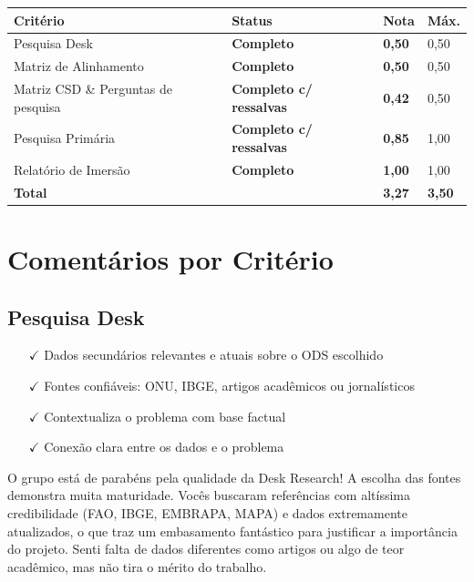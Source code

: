 \documentclass[
  sigconf,
  nonacm, %
  language=portuguese
]{acmart}
\newcommand{\statusok}[1]{{\small\bfseries\color{cgood}#1}}
\newcommand{\statuswarn}[1]{{\small\bfseries\color{cwarn}#1}}
\begin{document}
\begin{tabular}{@{} L{2.6cm} C{2.5cm} C{1.1cm} C{1.1cm} @{}}
\toprule
\textbf{Critério} & \textbf{Status} & \textbf{Nota} & \textbf{Máx.} \\
\midrule
Pesquisa Desk & \statusok{Completo} & \textbf{0,50} & 0,50 \\
Matriz de Alinhamento & \statusok{Completo} & \textbf{0,50} & 0,50 \\
Matriz CSD \& Perguntas de pesquisa & \statuswarn{Completo c/ ressalvas} & \textbf{0,42} & 0,50 \\
Pesquisa Primária & \statuswarn{Completo c/ ressalvas} & \textbf{0,85} & 1,00 \\
Relatório de Imersão & \statusok{Completo} & \textbf{1,00} & 1,00 \\
\midrule
\textbf{Total} & & \textbf{\color{cred}3,27} & \textbf{3,50} \\
\bottomrule
\end{tabular}

\section{Comentários por Critério}

\subsection{Pesquisa Desk}

\noindent\statusok{0,50\,/\,0,50 pts · Completo}

\begin{itemize}[leftmargin=14pt,itemsep=1pt,topsep=3pt,parsep=0pt]
  \item[\textcolor{cgood}{$\checkmark$}] {\small\textcolor{cgood}{Dados secundários relevantes e atuais sobre o ODS escolhido}}
  \item[\textcolor{cgood}{$\checkmark$}] {\small\textcolor{cgood}{Fontes confiáveis: ONU, IBGE, artigos acadêmicos ou jornalísticos}}
  \item[\textcolor{cgood}{$\checkmark$}] {\small\textcolor{cgood}{Contextualiza o problema com base factual}}
  \item[\textcolor{cgood}{$\checkmark$}] {\small\textcolor{cgood}{Conexão clara entre os dados e o problema}}
\end{itemize}

O grupo está de parabéns pela qualidade da Desk Research! A escolha das fontes demonstra muita maturidade. Vocês buscaram referências com altíssima credibilidade (FAO, IBGE, EMBRAPA, MAPA) e dados extremamente atualizados, o que traz um embasamento fantástico para justificar a importância do projeto. Senti falta de dados diferentes como artigos ou algo de teor acadêmico, mas não tira o mérito do trabalho.
\end{document}

